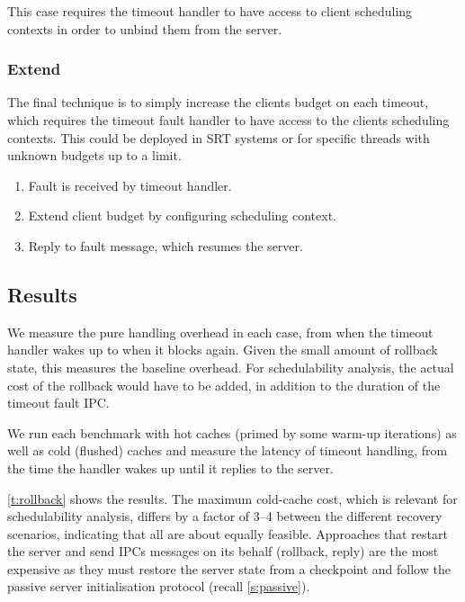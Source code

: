 This case requires the timeout handler to have access to client scheduling contexts in order to
unbind them from the server. 

\subsubsection{Extend}

The final technique is to simply increase the clients budget on each timeout, which requires the
timeout fault handler to have access to the clients scheduling contexts.
This could be deployed in \gls{SRT} systems or for specific threads with unknown budgets up to a limit. 

\begin{enumerate}\label{e:extend}
    \item Fault is received by timeout handler.
    \item Extend client budget by configuring scheduling context.
    \item Reply to fault message, which resumes the server.
\end{enumerate}

\subsection{Results}

We measure the pure handling overhead in each case, from when the timeout handler wakes up to when it blocks again. 
 Given the small amount of rollback state, this measures the baseline
    overhead. For schedulability analysis, the actual cost of the rollback would
have to be added, in addition to the duration of the timeout fault IPC. 
 
We run each benchmark with hot caches (primed by some warm-up
iterations)  as well as cold (flushed) caches and measure the 
latency of timeout handling, from the time the handler wakes up
until it replies to the server.

\autoref{t:rollback} shows the results. The maximum
cold-cache cost, which is relevant for schedulability analysis,
differs by a factor of 3--4 between the different recovery scenarios,
indicating that all are about equally feasible.
Approaches that restart the server and send \glspl{IPC} messages on its behalf (rollback, reply) are the most expensive
as they must restore the server state from a
checkpoint and follow the passive server initialisation protocol
(recall \autoref{s:passive}). 

